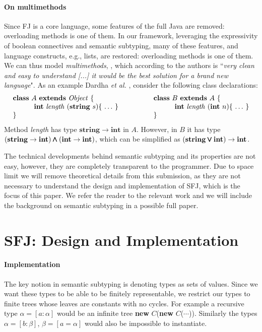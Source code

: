 \documentclass[runningheads]{llncs}
\begin{document}
\paragraph{On multimethods}
Since FJ is a core language, some features of the full Java are removed: overloading methods is one of them.
In our framework, leveraging the expressivity of boolean connectives and semantic subtyping, many of these features, and language constructs, e.g., lists, are restored: overloading methods is one of them. We can thus model \emph{multimethods}, \cite{BC97}, which according to the authors is ``\emph{very clean and easy to understand [...] it would be the best solution for a brand new language}".
As an example Dardha \emph{et al.}  \cite{Dardha2013,Dardha2017}, consider the following class declarations:
$$
\begin{array}{ll}
\mathbf{class} \  A \ \mathbf{extends }\  \mathit{Object}\ \{
&
\qquad
\mathbf{class} \  B \ \mathbf{extends }\  A\ \{
\\
	\qquad\quad \mathbf{int}\ \mathit{length}\ (\mathbf{string}\ s)\{\ \ldots\ \}\qquad
&
	\qquad\qquad\quad \mathbf{int}\ \mathit{length}\ (\mathbf{int}\ n)\{\ \ldots\ \}
\\
\}
&
\qquad \}
\end{array}
$$
Method {\it length} has type $\mathbf{string} \rightarrow \mathbf{int}$ in $A$. However, in $B$ it has type $(\mathbf{string} \rightarrow \mathbf{int}) \pmb{\wedge} (\mathbf{int} \rightarrow \mathbf{int})$,
which can be simplified as $(\mathbf{string} \pmb{\vee} \mathbf{int}) \rightarrow \mathbf{int}$.

The technical developments behind semantic subtyping and its properties are not easy, however, they are completely transparent to the programmer.
Due to space limit we will remove theoretical details from this submission, as they are not necessary to understand the design and implementation of SFJ, which is the focus of this paper. We refer the reader to the relevant work \cite{Dardha2013,Dardha2017} and we will include the background on semantic subtyping in a possible full paper.


\section{SFJ: Design and Implementation}
\label{sec:design}
\paragraph{Implementation}
The key notion in semantic subtyping is denoting types as sets of values. 
Since we want these types to be able to be finitely representable, we restrict our types to finite trees whose leaves are constants with no cycles. 
For example a recursive type $\alpha = [a : \alpha]$ would be an infinite tree \textbf{new} $C$(\textbf{new} $C$($\cdots{}$)). 
Similarly the types $\alpha = [b: \beta]$, $\beta = [a = \alpha]$ would also be impossible to instantiate.
\end{document}
